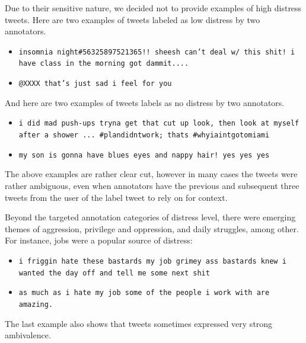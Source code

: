 \documentclass[11pt]{article}
\begin{document}

Due to their sensitive nature, we decided not to provide examples of high distress tweets. Here are two examples of tweets labeled as low distress by two annotators. 
\begin{itemize}
\footnotesize
\item \texttt{insomnia night\#56325897521365!! sheesh can't deal w/ this shit! i have class in the morning got dammit.... }

\item \texttt{@XXXX that's just sad i feel for you}
\end{itemize}

And here are two examples of tweets labels as no distress by two annotators.

\begin{itemize}
\footnotesize
\item \texttt{i did mad push-ups tryna get that cut up look, then look at myself after a shower ... \#plandidntwork; thats \#whyiaintgotomiami}

\item \texttt{my son is gonna have blues eyes and nappy hair! yes yes yes}
\end{itemize}

The above examples are rather clear cut, however in many cases the tweets were rather ambiguous, even when annotators have the previous and subsequent three tweets from the user of the label tweet to rely on for context. 

Beyond the targeted annotation categories of distress level, there were emerging themes of aggression, privilege and oppression, and daily struggles, among other.  For instance, jobs were a popular source of distress:

\begin{itemize}
\footnotesize
\item \texttt{i friggin hate these bastards \@ my job grimey ass bastards knew i wanted the day off and tell me some next shit}
\item \texttt{as much as i hate my job some of the people i work with are amazing.}
\end{itemize}

The last example also shows that tweets sometimes expressed very strong ambivalence.
\end{document}

